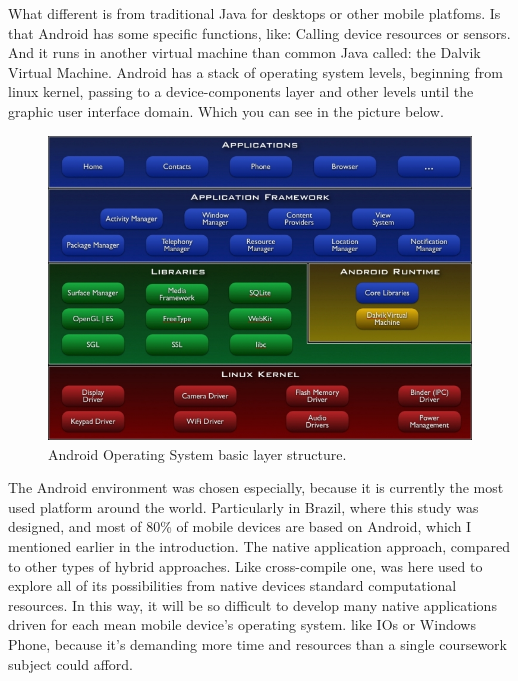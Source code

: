 What different is from traditional Java for desktops or other mobile platfoms. Is that Android has some specific functions, like: Calling device resources or sensors.  And it runs in another virtual machine than common Java called: the Dalvik Virtual Machine. Android has a stack of operating system levels, beginning from linux kernel, passing to a device-components layer and other levels until the graphic user interface domain. Which you can see in the picture below.
		
		\begin{figure}[htp]
			\begin{center}
				\includegraphics[scale=0.65]{chapters/desenvolvimento/img/android.jpeg}
				\caption{Android Operating System basic layer structure.}
				\label{android}
			\end{center}
		\end{figure}
		
The Android environment was chosen especially, because it is currently the most used platform around the world. Particularly in Brazil, where this study was designed, and most of 80\% of mobile devices are based on  Android, which I mentioned earlier in the introduction. The native application approach, compared to other types of hybrid approaches. Like cross-compile one, was here used to explore all of its possibilities from native devices standard computational resources. In this way, it will be so difficult to develop many native applications driven for each mean mobile device's operating system. like IOs or Windows Phone, because it’s demanding more time and resources than a single coursework subject could afford.

